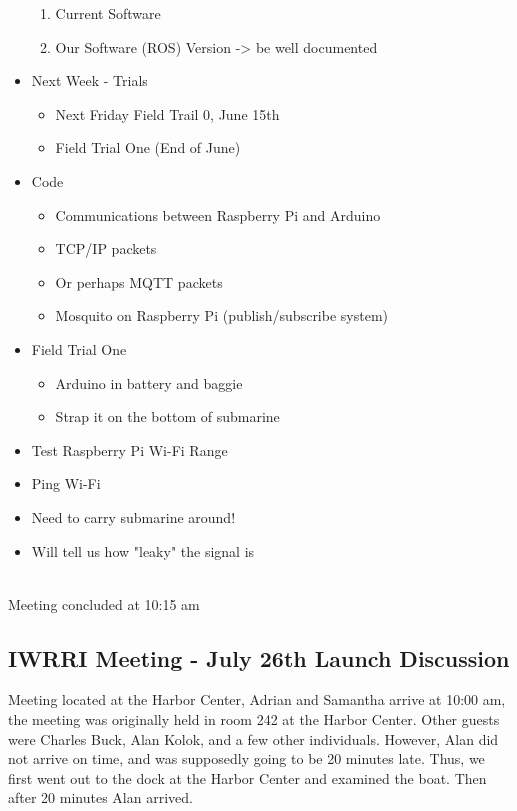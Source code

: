 \documentclass[12pt]{article}
\begin{document}
\begin{itemize}
				\begin{enumerate}
					\item Current Software
					\item Our Software (ROS) Version -> be well documented
				\end{enumerate}
				\item Next Week - Trials
				\begin{itemize}
					\item Next Friday Field Trail 0, June 15th
					\item Field Trial One (End of June)
				\end{itemize}
				\item Code
				\begin{itemize}
					\item Communications between Raspberry Pi and Arduino 
					\item TCP/IP packets
					\item Or perhaps MQTT packets
					\item Mosquito on Raspberry Pi (publish/subscribe system)
				\end{itemize}
				\item Field Trial One
				\begin{itemize}
					\item Arduino in battery and baggie
					\item Strap it on the bottom of submarine
				\end{itemize}
				\item Test Raspberry Pi Wi-Fi Range
				\item Ping Wi-Fi
				\item Need to carry submarine around!
				\item Will tell us how "leaky" the signal is
			\end{itemize}
		
			\noindent
			\\Meeting concluded at 10:15 am
		
			\clearpage
	
	
		\subsection{IWRRI Meeting - July 26th Launch Discussion}
		
			\noindent
			Meeting located at the Harbor Center, Adrian and Samantha arrive at 10:00 am, the meeting was originally held in room 242 at the Harbor Center. Other guests were Charles Buck, Alan Kolok, and a few other individuals. However, Alan did not arrive on time, and was supposedly going to be 20 minutes late. Thus, we first went out to the dock at the Harbor Center and examined the boat. Then after 20 minutes Alan arrived.
			
\end{document}
